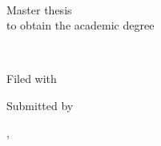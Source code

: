 
\begin{titlepage}




\begin{center}
~
\vfill\vfill
\vfill\vfill
\vfill\vfill
\vfill\vfill
\vfill\vfill
\vfill\vfill
\vfill\vfill
\vfill\vfill
{\LARGE\bfseries\mytitle}\\
\vfill
{\Large\myworktitle}
\end{center}

\vfill\vfill
\vfill\vfill
\vfill\vfill
\vfill\vfill

\begin{flushright}
    Master thesis \\
    to obtain the academic degree\\
    \vfill
    \textbf\mygrade

    \vfill\vfill
    \vfill\vfill
    \vfill\vfill
    \vfill\vfill
    \vfill\vfill
    \vfill\vfill
    \vfill\vfill
    \vfill\vfill

    \myuniversity\\
    \mystudy

    \vfill\vfill
    \vfill\vfill
    \vfill\vfill
    \vfill\vfill

    Filed with\\
    \myevaluator

    \vfill\vfill

    Submitted by\\
    \myauthor

    \vfill\vfill
    \vfill\vfill

    \mysubmissiontown, \mysubmissionmonth~\mysubmissionyear
\end{flushright}

\end{titlepage}

\newpage

